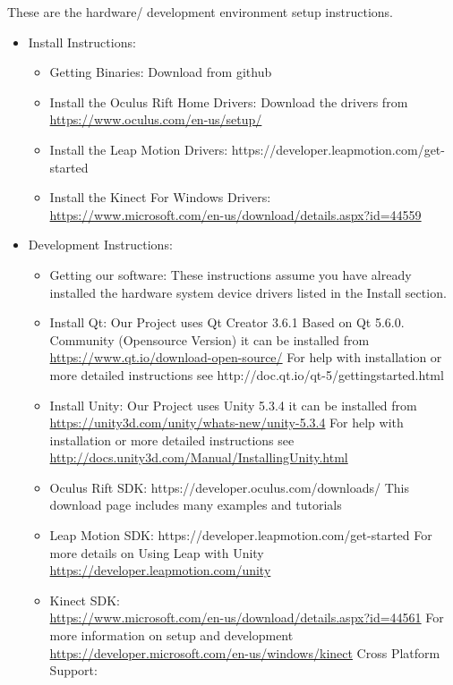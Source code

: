 \documentclass[a4paper,10pt]{article}
\begin{document}
These are the hardware/ development environment setup instructions. 
\begin{itemize}
\item Install Instructions:
\begin{itemize}
\item  Getting Binaries: Download from github
  \item Install the Oculus Rift Home Drivers: Download the drivers from~\\ \url{https://www.oculus.com/en-us/setup/}
  \item Install the Leap Motion Drivers: https://developer.leapmotion.com/get-started
  \item Install the Kinect For Windows Drivers: ~\\\url{https://www.microsoft.com/en-us/download/details.aspx?id=44559}
\end{itemize}
\item Development Instructions:
  \begin{itemize}
  \item Getting our software: These instructions assume you have already installed the hardware system device drivers 
listed in the Install section.
\item Install Qt:
Our Project uses Qt Creator 3.6.1 Based on Qt 5.6.0. Community (Opensource Version) 
it can be installed from ~\\\url{https://www.qt.io/download-open-source/}
For help with installation or more detailed instructions see
http://doc.qt.io/qt-5/gettingstarted.html 
\item Install Unity:
Our Project uses Unity 5.3.4 
it can be installed from 
~\\\url{https://unity3d.com/unity/whats-new/unity-5.3.4}
For help with installation or more detailed instructions see
~\\\url{http://docs.unity3d.com/Manual/InstallingUnity.html}
\item Oculus Rift SDK:
https://developer.oculus.com/downloads/
This download page includes many examples and tutorials
\item Leap Motion SDK:
https://developer.leapmotion.com/get-started
For more details on Using Leap with Unity ~\\\url{https://developer.leapmotion.com/unity} 
\item Kinect SDK:
~\\\url{https://www.microsoft.com/en-us/download/details.aspx?id=44561}
For more information on setup and development  ~\\\url{https://developer.microsoft.com/en-us/windows/kinect}
Cross Platform Support:


\end{itemize}
\end{itemize}
\end{document}
